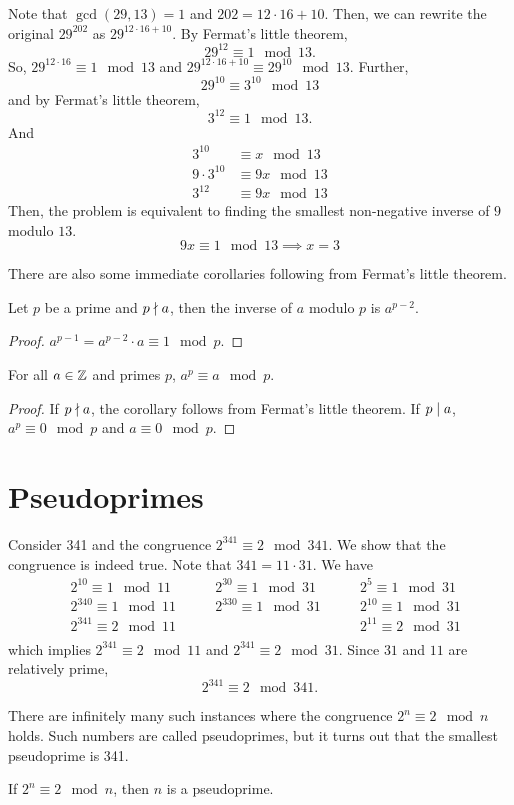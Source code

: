 Note that $\gcd(29,13) = 1$ and $202 = 12 \cdot 16 + 10$. Then, we can rewrite the original $29^{202}$ as $29^{12 \cdot 16 + 10}$. By Fermat's little theorem,
$$
29^{12} \equiv 1 \mod 13.
$$
So, $29^{12 \cdot 16} \equiv 1 \mod 13$ and $29^{12 \cdot 16 + 10} \equiv 29^{10} \mod 13$. Further,
$$
29^10 \equiv 3^{10} \mod 13
$$
and by Fermat's little theorem,
$$
3^{12} \equiv 1 \mod 13.
$$
And
$$
\begin{aligned}
    3^{10} &\equiv x \mod 13 \\
    9 \cdot 3^{10} &\equiv 9x \mod 13 \\
    3^{12} &\equiv 9x \mod 13
\end{aligned}
$$
Then, the problem is equivalent to finding the smallest non-negative inverse of $9$ modulo $13$.
$$
9x \equiv 1 \mod 13 \implies x = 3
$$

There are also some immediate corollaries following from Fermat's little theorem.

\begin{corollary}
    Let $p$ be a prime and $p \mathrel{\nmid} a$, then the inverse of $a$ modulo $p$ is $a^{p-2}$.
\end{corollary}

\begin{proof}
    $a^{p-1} = a^{p-2} \cdot a \equiv 1 \mod p$.
\end{proof}

\begin{corollary}
    For all $a \in \mathbb{Z}$ and primes $p$, $a^{p} \equiv a \mod p$. 
\end{corollary}

\begin{proof}
    If $p \mathrel{\nmid} a$, the corollary follows from Fermat's little theorem. If $p \mathrel{\mid} a$, $a^p \equiv 0 \mod p$ and $a \equiv 0 \mod p$.
\end{proof}

\section{Pseudoprimes}

Consider 341 and the congruence $2^{341} \equiv 2 \mod 341$. We show that the congruence is indeed true. Note that $341 = 11 \cdot 31$. We have
$$
\begin{aligned}
    & 2^{10} \equiv 1 \mod 11 \qquad & 2^{30} \equiv 1 \mod 31 \qquad & 2^{5} \equiv 1 \mod 31 \\
    & 2^{340} \equiv 1 \mod 11 \qquad & 2^{330} \equiv 1 \mod 31 \qquad & 2^{10} \equiv 1 \mod 31 \\
    & 2^{341} \equiv 2 \mod 11 \qquad & & 2^{11} \equiv 2 \mod 31 \\
\end{aligned}
$$
which implies $2^{341} \equiv 2 \mod 11$ and $2^{341} \equiv 2 \mod 31$. Since $31$ and $11$ are relatively prime,
$$
2^{341} \equiv 2 \mod 341.
$$

There are infinitely many such instances where the congruence $2^{n} \equiv 2 \mod n$ holds. Such numbers are called pseudoprimes, but it turns out that the smallest pseudoprime is 341.

\begin{definition}
    If $2^n \equiv 2 \mod n$, then $n$ is a pseudoprime.
\end{definition}